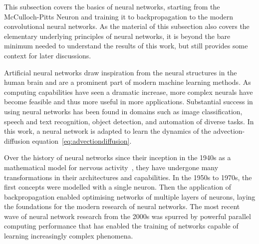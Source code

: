 This subsection covers the basics of neural networks, starting from the McCulloch-Pitts Neuron and training it to backpropagation to the modern convolutional neural networks.
As the material of this subsection also covers the elementary underlying principles of neural networks, it is beyond the bare minimum needed to understand the results of this work, but still provides some context for later discussions.

Artificial neural networks draw inspiration from the neural structures in the human brain and are a prominent part of modern machine learning methods.
As computing capabilities have seen a dramatic increase, more complex neurals have become feasible and thus more useful in more applications.
Substantial success in using neural networks has been found in domains such as image classification, speech and text recognition, object detection, and automation of diverse tasks.
In this work, a neural network is adapted to learn the dynamics of the advection-diffusion equation~\eqref{eq:advectiondiffusion}.

Over the history of neural networks since their inception in the 1940s as a mathematical model for nervous activity~\cite{mcculloch, hebb}, they have undergone many transformations in their architectures and capabilities.
In the 1950s to 1970s, the first concepts were modelled with a single neuron.
Then the application of backpropagation enabled optimising networks of multiple layers of neurons, laying the foundations for the modern research of neural networks.
The most recent wave of neural network research from the 2000s was spurred by powerful parallel computing performance that has enabled the training of networks capable of learning increasingly complex phenomena.


